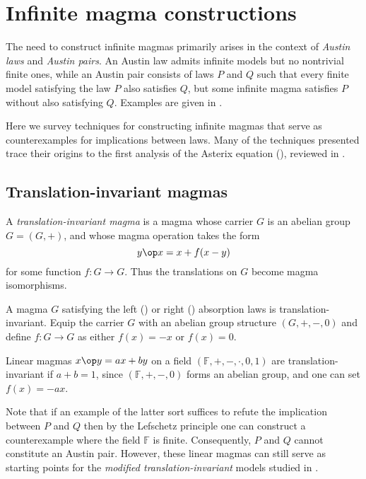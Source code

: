 \chapter{Infinite magma constructions}\label{infinite-magma-constructions-chapter}

The need to construct infinite magmas primarily arises in the context of \emph{Austin laws} and \emph{Austin pairs}.
An Austin law admits infinite models but no nontrivial finite ones, while an Austin pair consists of
laws $P$ and $Q$ such that every finite model satisfying the law $P$ also satisfies $Q$, but some
infinite magma satisfies $P$ without also satisfying $Q$. Examples are given in .

Here we survey techniques for constructing infinite magmas that serve as counterexamples for implications
between laws. Many of the techniques presented trace their origins to the first analysis of the Asterix equation
(), reviewed in .

\section{Translation-invariant magmas}

A \emph{translation-invariant magma} is a magma whose carrier $G$ is an abelian group $G = (G,+)$, and whose magma operation takes the form
$$ y \op x = x + f(x-y)$$
for some function $f: G \to G$.  Thus the translations on $G$ become magma isomorphisms.

\begin{example}
  A magma $G$ satisfying the left () or right () absorption laws is translation-invariant.
  Equip the carrier $G$ with an abelian group structure $(G,+,-,0)$ and define $f: G \to G$ as either $f(x) = -x$ or $f(x) = 0$.
\end{example}

\begin{example}
  Linear magmas $x\op y = ax+by$ on a field $(\mathbb{F},+,-,\cdot,0,1)$ are translation-invariant if $a + b = 1$,
  since $(\mathbb{F},+,-,0)$ forms an abelian group, and one can set $f(x) = -ax$.
\end{example}

Note that if an example of the latter sort suffices to refute the implication between $P$ and $Q$ then
by the Lefschetz principle one can construct a counterexample where the field $\mathbb{F}$ is finite.
Consequently, $P$ and $Q$ cannot constitute an Austin pair. However, these linear magmas can still serve
as starting points for the \emph{modified translation-invariant} models studied in .

